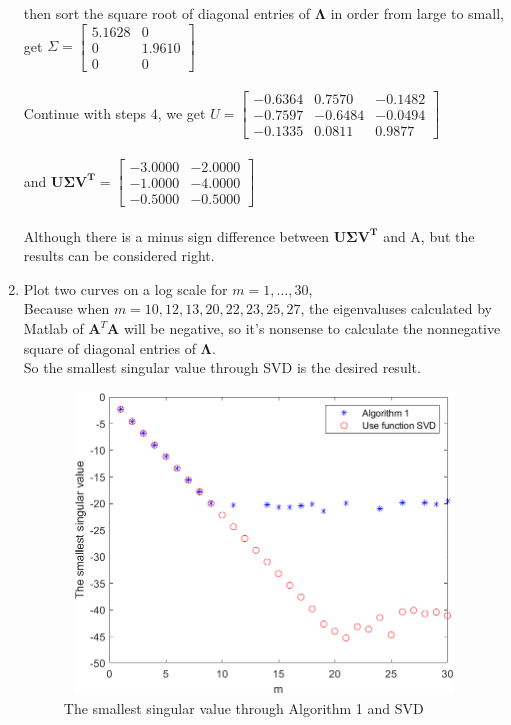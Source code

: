 \documentclass[english,onecolumn]{IEEEtran}
\begin{document}
\begin{enumerate}
	then sort the square root of diagonal entries of $\mathbf{\Lambda}$ in order from large to small, get $\Sigma=\left[ \begin{array}{rr} 5.1628 & 0 \\ 0 & 1.9610\\ 0 & 0\end{array}\right]$\\\\
	Continue with steps 4, we get $U=\left[\begin{array}{rrr} -0.6364 & 0.7570 & -0.1482 \\
		-0.7597 & -0.6484 & -0.0494 \\
		-0.1335 & 0.0811 & 0.9877\end{array}\right]$\\\\
	and $\mathbf{U\Sigma V^T}=\left[\begin{array}{rr}-3.0000 & -2.0000 \\ -1.0000 & -4.0000 \\ -0.5000 & -0.5000\end{array}\right]$	\\\\
	Although there is a minus sign difference between $\mathbf{U\Sigma V^T}$ and A, but the results can be considered right.
	
	\item Plot two curves on a log scale for $m=1,\dots,30$, \\
	Because when $m=10,12,13,20,22,23,25,27$,  the eigenvaluses calculated by Matlab of $\mathbf{A}^T\mathbf{A}$ will be negative, so it's nonsense to calculate the nonnegative square of diagonal entries of $\mathbf{\Lambda}$.\\ 
	So the smallest singular value through SVD is the desired result.
	\begin{figure}[hbp]
		\centering
		\includegraphics[height=8cm,width=12cm]{pro2_3.png}
		\caption{The smallest singular value through Algorithm 1 and SVD}
		\label{1}
	\end{figure} 

	
	
	

\end{enumerate}
\end{document}
